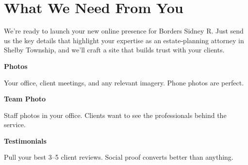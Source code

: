 \documentclass[11pt,letterpaper]{article}
\begin{document}
\vspace{0.2em}

\section*{What We Need From You}

We’re ready to launch your new online presence for Borders Sidney R. Just send us the key details that highlight your expertise as an estate‑planning attorney in Shelby Township, and we’ll craft a site that builds trust with your clients.

\vspace{0.12em}

\noindent\begin{minipage}[t]{0.48\textwidth}
\begin{tcolorbox}[colframe=accent-teal, boxrule=1pt, left=0.7em, right=0.7em, top=0.5em, bottom=0.5em, arc=4pt, boxsep=0pt]
{\bfseries\small\color{accent-teal}Photos}

\vspace{0.15em}

{\small Your office, client meetings, and any relevant imagery. Phone photos are perfect.}
\end{tcolorbox}

\vspace{0.1em}

\begin{tcolorbox}[colframe=accent-teal, boxrule=1pt, left=0.7em, right=0.7em, top=0.5em, bottom=0.5em, arc=4pt, boxsep=0pt]
{\bfseries\small\color{accent-teal}Team Photo}

\vspace{0.15em}

{\small Staff photos in your office. Clients want to see the professionals behind the service.}
\end{tcolorbox}

\vspace{0.1em}

\begin{tcolorbox}[colframe=accent-teal, boxrule=1pt, left=0.7em, right=0.7em, top=0.5em, bottom=0.5em, arc=4pt, boxsep=0pt]
{\bfseries\small\color{accent-teal}Testimonials}

\vspace{0.15em}

{\small Pull your best 3--5 client reviews. Social proof converts better than anything.}
\end{tcolorbox}
\end{minipage}
\end{document}
